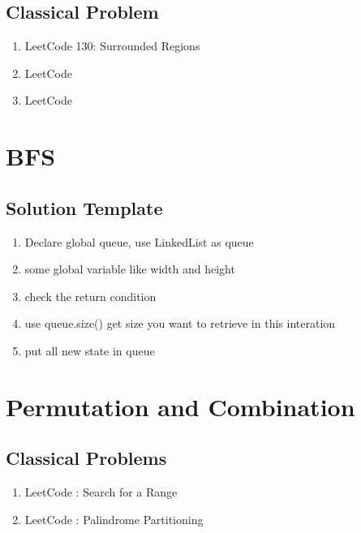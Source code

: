 \section{ Classical Problem }

\begin{enumerate}
    \item LeetCode 130: Surrounded Regions
    \item LeetCode
    \item LeetCode

\end{enumerate}

\chapter{ BFS }

\section{ Solution Template }

 \begin{enumerate}
    \item  Declare global queue, use LinkedList as queue

    \item  some global variable like width and height

    \item  check the return condition

    \item  use queue.size() get size you want to retrieve in this interation

    \item  put all new state in queue

\end{enumerate}


\chapter{ Permutation and Combination }

\section{ Classical  Problems }

 \begin{enumerate}
    \item  LeetCode : Search for a Range

    \item  LeetCode : Palindrome Partitioning

\end{enumerate}
